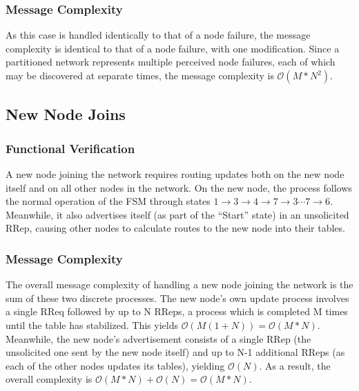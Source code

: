 \subsubsection{Message Complexity}
As this case is handled identically to that of a node failure, the message complexity is identical to that of a node failure, with one modification. Since a partitioned network represents multiple perceived node failures, each of which may be discovered at separate times, the message complexity is $\mathcal{O}(M*N^2)$.

\subsection{New Node Joins}\label{subsec:IPNewNodeJoins}
\subsubsection{Functional Verification}
A new node joining the network requires routing updates both on the new node itself and on all other nodes in the network. On the new node, the process follows the normal operation of the FSM through states $1 \rightarrow 3 \rightarrow 4 \rightarrow 7 \rightarrow 3 \cdots 7 \rightarrow 6$. Meanwhile, it also advertises itself (as part of the ``Start'' state) in an unsolicited RRep, causing other nodes to calculate routes to the new node into their tables.
\subsubsection{Message Complexity}
The overall message complexity of handling a new node joining the network is the sum of these two discrete processes. The new node's own update process involves a single RReq followed by up to N RReps, a process which is completed M times until the table has stabilized. This yields $\mathcal{O}(M(1+N)) = \mathcal{O}(M*N)$. Meanwhile, the new node's advertisement consists of a single RRep (the unsolicited one sent by the new node itself) and up to N-1 additional RReps (as each of the other nodes updates its tables), yielding $\mathcal{O}(N)$. As a result, the overall complexity is $\mathcal{O}(M*N) + \mathcal{O}(N) = \mathcal{O}(M*N)$.